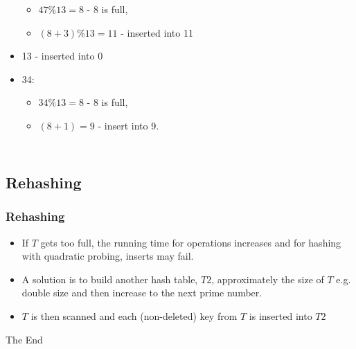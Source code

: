 \documentclass{beamer}
\begin{document}
\begin{frame}
\begin{columns}[c]
\begin{itemize}
\begin{itemize}
\tiny
\item $47\%13 = 8$ - 8 is full,
\item $(8+3)\%13 = 11$ - inserted into 11
\end{itemize}
\item 13 - inserted into 0
\item 34:
\begin{itemize}
\tiny
\item $34\%13 = 8$ - 8 is full,
\item $(8+1) = 9$ - insert into 9. 
\end{itemize}
\end{itemize}
\end{columns}
\end{frame}
\subsection{Rehashing}
\begin{frame}
\frametitle{Rehashing}
\begin{itemize}
\item If $T$ gets too full, the running time for operations increases and for hashing with quadratic probing, inserts may fail.
\item A solution is to build another hash table, $T2$, approximately the size of $T$ e.g. double size and then increase to the next prime number.
\item $T$ is then scanned and each (non-deleted) key from $T$ is inserted into $T2$
\end{itemize}
\end{frame}
\begin{frame} 
\Huge{\centerline{The End}}
\end{frame}
\end{document}
